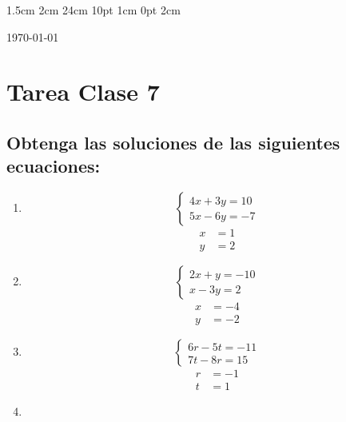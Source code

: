 \documentclass[12pt,letterpaper]{report}
\begin{document}
\setmargins{2.5cm}      
{1.5cm}                     
{2cm}  
{24cm}                    
{10pt}                          
{1cm}                          
{0pt}                             
{2cm}
\begin{flushright}
\today
\end{flushright}
\vspace{-1.75cm}
\section*{Tarea Clase 7}
\subsection*{Obtenga las soluciones de las siguientes ecuaciones:}
\begin{enumerate}
    \item\begin{equation*}
        \left\lbrace \begin{matrix}
             4x+3y=10 \\
             5x-6y=-7
        \end{matrix} \right.
    \end{equation*}
    \begin{align*}
        x&=1\\
        y&=2
    \end{align*}
    \item\begin{equation*}
        \left\lbrace \begin{matrix}
           2x+y=-10 \\
           x-3y=2  
        \end{matrix} \right.
    \end{equation*}
    \begin{align*}
        x&=-4\\
        y&=-2
    \end{align*}
    \item\begin{equation*}
        \left\lbrace \begin{matrix}
             6r-5t=-11\\
             7t-8r=15
        \end{matrix} \right.
    \end{equation*}\begin{align*}
        r&=-1\\
        t&=1
    \end{align*}
    \item\begin{equation*}

\end{equation*}
\end{enumerate}
\end{document}
